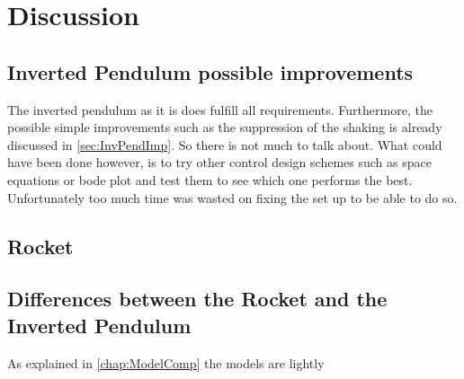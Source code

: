 \chapter{Discussion}\label{sec:Discussion}

\section{Inverted Pendulum possible improvements}

The inverted pendulum as it is does fulfill all requirements. Furthermore, the possible simple improvements such as the suppression of the shaking is already discussed in \autoref{sec:InvPendImp}. So there is not much to talk about. What could have been done however, is to try other control design schemes such as space equations or bode plot and test them to see which one performs the best. Unfortunately too much time was wasted on fixing the set up to be able to do so.

\section{Rocket}



\section{Differences between the Rocket and the Inverted Pendulum}

As explained in \autoref{chap:ModelComp} the models are lightly